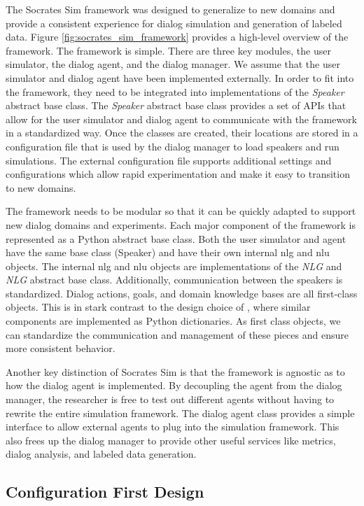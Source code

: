 The Socrates Sim framework was designed to generalize to new domains and provide a consistent experience for dialog simulation and generation of labeled data. Figure \ref{fig:socrates_sim_framework} provides a high-level overview of the framework. The framework is simple. There are three key modules, the user simulator, the dialog agent, and the dialog manager. We assume that the user simulator and dialog agent have been implemented externally. In order to fit into the framework, they need to be integrated into implementations of the \textit{Speaker} abstract base class. The \textit{Speaker} abstract base class provides a set of APIs that allow for the user simulator and dialog agent to communicate with the framework in a standardized way. Once the classes are created, their locations are stored in a configuration file that is used by the dialog manager to load speakers and run simulations. The external configuration file supports additional settings and configurations which allow rapid experimentation and make it easy to transition to new domains.

The framework needs to be modular so that it can be quickly adapted to support new dialog domains and experiments. Each major component of the framework is represented as a Python abstract base class. Both the user simulator and agent have the same base class (Speaker) and have their own internal nlg and nlu objects. The internal nlg and nlu objects are implementations of the \textit{NLG} and \textit{NLG} abstract base class. Additionally, communication between the speakers is standardized. Dialog actions, goals, and domain knowledge bases are all first-class objects. This is in stark contrast to the design choice of \cite{li_end_to_end}, where similar components are implemented as Python dictionaries. As first class objects, we can standardize the communication and management of these pieces and ensure more consistent behavior.

Another key distinction of Socrates Sim is that the framework is agnostic as to how the dialog agent is implemented. By decoupling the agent from the dialog manager, the researcher is free to test out different agents without having to rewrite the entire simulation framework.  The dialog agent class provides a simple interface to allow external agents to plug into the simulation framework. This also frees up the dialog manager to provide other useful services like metrics, dialog analysis, and labeled data generation.

\subsection{Configuration First Design} 

